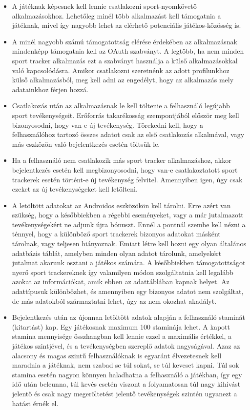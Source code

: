 \begin{itemize}
	\item A játéknak képesnek kell lennie csatlakozni sport-nyomkövető alkalmazásokhoz. Lehetőleg minél több alkalmazást kell támogatnia a játéknak, mivel így nagyobb lehet az elérhető potenciális játékos-közösség is.
	\item A minél nagyobb számú támogatottság elérése érdekében az alkalmazásnak mindenképp támogatnia kell az OAuth szabványt. A legtöbb, ha nem minden sport tracker alkalmazás ezt a szabványt használja a külső alkalmazásokkal való kapcsolódásra. Amikor csatlakozni szeretnénk az adott profilunkhoz külső alkalmazásból, meg kell adni az engedélyt, hogy az alkalmazás mely adatainkhoz férjen hozzá.
	\item Csatlakozás után az alkalmazásnak le kell töltenie a felhasználó legújabb sport tevékenységeit. Erőforrás takarékosság szempontjából először meg kell bizonyosodni, hogy van-e új tevékenység. Törekedni kell, hogy a felhasználóhoz tartozó összes adatot csak az első csatlakozás alkalmával, vagy más eszközön való bejelentkezés esetén töltsük le.
	\item Ha a felhasználó nem csatlakozik más sport tracker alkalmazáshoz, akkor bejelentkezés esetén kell megbizonyosodni, hogy van-e csatlakoztatott sport trackerek esetén történt-e új tevékenység felvitel. Amennyiben igen, úgy csak ezeket az új tevékenységeket kell letölteni.
	\item A letöltött adatokat az Androidos eszközökön kell tárolni. Erre azért van szükség, hogy a későbbiekben a régebbi eseményeket, vagy a már jutalmazott tevékenységekért ne adjunk újra bónuszt. Ennél a pontnál szembe kell nézni a ténnyel, hogy a különböző sport trackerek bizonyos adatokat másként tárolnak, vagy teljesen hiányoznak. Emiatt létre kell hozni egy olyan általános adatbázis táblát, amelyben minden olyan adatot tárolunk, amelyekért jutalmat akarunk osztani a játékos számára. A későbbiekben támogatottságot nyerő sport trackereknek így valamilyen módon szolgáltatnia kell legalább azokat az információkat, amik ebben az adattáblában kapnak helyet. Az adattípusuk különbözhet, és amennyiben egy bizonyos adatot nem szolgáltat, de más adatokból származtatni lehet, úgy az nem okozhat akadályt.
	\item Bejelentkezés után az újonnan letöltött adatok alapján a felhasználó staminát (kitartást) kap. Egy játékosnak maximum 100 staminája lehet. A kapott stamina mennyisége összhangban kell lennie ezzel a maximális értékkel, a játékos szintjével, és a tevékenységben szereplő adatok nagyságával. Azaz az alacsony és magas szintű felhasználóknak is egyaránt élvezetesnek kell maradnia a játéknak, nem szabad se túl sokat, se túl keveset kapni. Túl sok stamina esetén nagyon könnyen haladhatna a felhasználó a játékban, így egy idő után beleunna, túl kevés esetén viszont a folyamatosan túl nagy kihívást jelentő és csak nagy megerőltetést jelentő tevékenységek szintén ugyanezt a hatást érnék el.

\end{itemize}
